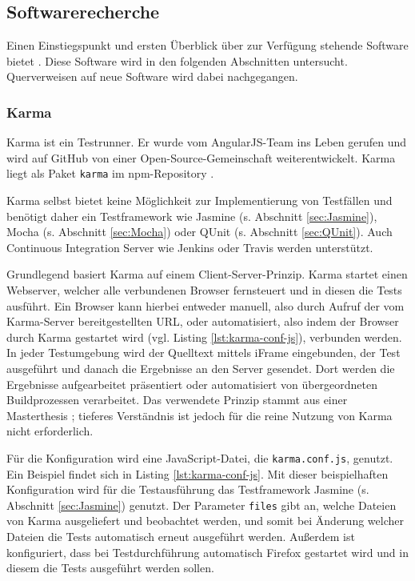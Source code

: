 \subsection{Softwarerecherche}
Einen Einstiegspunkt und ersten Überblick über zur Verfügung stehende Software bietet  \cite{unittest-overview}. Diese Software wird in den folgenden Abschnitten untersucht. Querverweisen auf neue Software wird dabei nachgegangen.

\subsubsection{Karma}
\label{sec:Karma}
Karma ist ein Testrunner. Er wurde vom AngularJS-Team ins Leben gerufen und wird auf GitHub von einer Open-Source-Gemeinschaft weiterentwickelt. \cite{karma-index} Karma liegt als Paket \texttt{karma} im npm-Repository \cite{karma-faq}.

Karma selbst bietet keine Möglichkeit zur Implementierung von Testfällen und benötigt daher ein Testframework wie Jasmine (s. Abschnitt \ref{sec:Jasmine}), Mocha (s. Abschnitt \ref{sec:Mocha}) oder QUnit (s. Abschnitt \ref{sec:QUnit}). Auch Continuous Integration Server wie Jenkins oder Travis werden unterstützt. \cite{karma-faq}

Grundlegend basiert Karma auf einem Client-Server-Prinzip. Karma startet einen Webserver, welcher alle verbundenen Browser fernsteuert und in diesen die Tests ausführt. Ein Browser kann hierbei entweder manuell, also durch Aufruf der vom Karma-Server bereitgestellten URL, oder automatisiert, also indem der Browser durch Karma gestartet wird (vgl. Listing \ref{lst:karma-conf-js}), verbunden werden. In jeder Testumgebung wird der Quelltext mittels iFrame eingebunden, der Test ausgeführt und danach die Ergebnisse an den Server gesendet. Dort werden die Ergebnisse aufgearbeitet präsentiert oder automatisiert von übergeordneten Buildprozessen verarbeitet. Das verwendete Prinzip stammt aus einer Masterthesis  \cite{karma-masterThesis}; tieferes Verständnis ist jedoch für die reine Nutzung von Karma nicht erforderlich. \cite{karma-howItWorks}

Für die Konfiguration wird eine JavaScript-Datei, die \texttt{karma.conf.js}, genutzt. Ein Beispiel findet sich in Listing \ref{lst:karma-conf-js}. Mit dieser beispielhaften Konfiguration wird für die Testausführung das Testframework Jasmine (s. Abschnitt \ref{sec:Jasmine}) genutzt. Der Parameter \texttt{files} gibt an, welche Dateien von Karma ausgeliefert und beobachtet werden, und somit bei Änderung welcher Dateien die Tests automatisch erneut ausgeführt werden. Außerdem ist konfiguriert, dass bei Testdurchführung automatisch Firefox gestartet wird und in diesem die Tests ausgeführt werden sollen. \cite{karma-configurationFile, karma-files}

